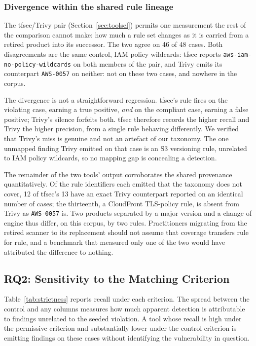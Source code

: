 \documentclass[journal]{IEEEtran}
\newcommand{\resulttable}[1]{%
  \IfFileExists{../results/tables/#1.tex}%
    {}%
    {\begin{table}[!t]\centering\small
       \fbox{\parbox{0.9\columnwidth}{\centering
         \texttt{\detokenize{results/tables/#1.tex}} not found.\\[2pt]
         Run \texttt{experiments/run\_baselines.sh} to generate it.}}%
     \end{table}}}
\renewcommand{\resulttable}[1]{}
\begin{document}
\subsubsection{Divergence within the shared rule lineage}
The tfsec/Trivy pair (Section~\ref{sec:toolsel}) permits one measurement the rest
of the comparison cannot make: how much a rule set changes as it is carried from a
retired product into its successor. The two agree on 46 of 48 cases. Both
disagreements are the same control, IAM policy wildcards: tfsec reports
\texttt{aws-iam-no-policy-wildcards} on both members of the pair, and Trivy emits
its counterpart \texttt{AWS-0057} on neither: not on these two cases, and nowhere
in the corpus.

The divergence is not a straightforward regression. tfsec's rule fires on the
violating case, earning a true positive, \emph{and} on the compliant case, earning a
false positive; Trivy's silence forfeits both. tfsec therefore records the higher
recall and Trivy the higher precision, from a single rule behaving differently. We
verified that Trivy's miss is genuine and not an artefact of our taxonomy. The
one unmapped finding Trivy emitted on that case is an S3 versioning rule, unrelated
to IAM policy wildcards, so no mapping gap is concealing a detection.

The remainder of the two tools' output corroborates the shared provenance
quantitatively. Of the rule identifiers each emitted that the taxonomy does not
cover, 12 of tfsec's 13 have an exact Trivy counterpart reported on an identical
number of cases; the thirteenth, a CloudFront TLS-policy rule, is absent from Trivy
as \texttt{AWS-0057} is. Two products separated by a major version and a change of
engine thus differ, on this corpus, by two rules. Practitioners migrating from the
retired scanner to its replacement should not assume that coverage transfers rule
for rule, and a benchmark that measured only one of the two would have attributed
the difference to nothing.

\subsection{RQ2: Sensitivity to the Matching Criterion}
\resulttable{strictness}

Table~\ref{tab:strictness} reports recall under each criterion. The spread
between the control and any columns measures how much apparent detection is
attributable to findings unrelated to the seeded violation. A tool whose recall
is high under the permissive criterion and substantially lower under the control
criterion is emitting findings on these cases without identifying the
vulnerability in question.
\end{document}
